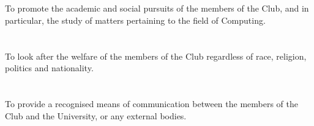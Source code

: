 
\section{}
To promote the academic and social pursuits of the members of the Club, and in particular, the study of matters pertaining to the field of Computing.

\section{}
To look after the welfare of the members of the Club regardless of race, religion, politics and nationality.

\section{}
To provide a recognised means of communication between the members of the Club and the University, or any external bodies.
